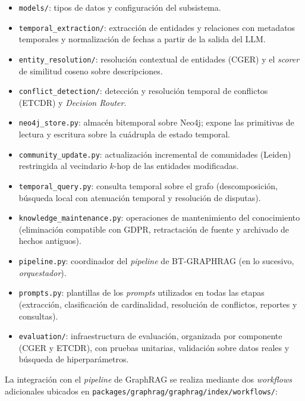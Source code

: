 \begin{itemize}
  \item \texttt{models/}: tipos de datos y configuración del subsistema.
  \item \texttt{temporal\_extraction/}: extracción de entidades y relaciones con metadatos temporales y normalización de fechas a partir de la salida del LLM.
  \item \texttt{entity\_resolution/}: resolución contextual de entidades (CGER) y el \emph{scorer} de similitud coseno sobre descripciones.
  \item \texttt{conflict\_detection/}: detección y resolución temporal de conflictos (ETCDR) y \emph{Decision Router}.
  \item \texttt{neo4j\_store.py}: almacén bitemporal sobre Neo4j; expone las primitivas de lectura y escritura sobre la cuádrupla de estado temporal.
  \item \texttt{community\_update.py}: actualización incremental de comunidades (Leiden) restringida al vecindario $k$-hop de las entidades modificadas.
  \item \texttt{temporal\_query.py}: consulta temporal sobre el grafo (descomposición, búsqueda local con atenuación temporal y resolución de disputas).
  \item \texttt{knowledge\_maintenance.py}: operaciones de mantenimiento del conocimiento (eliminación compatible con GDPR, retractación de fuente y archivado de hechos antiguos).
  \item \texttt{pipeline.py}: coordinador del \emph{pipeline} de BT-GRAPHRAG (en lo sucesivo, \emph{orquestador}).
  \item \texttt{prompts.py}: plantillas de los \emph{prompts} utilizados en todas las etapas (extracción, clasificación de cardinalidad, resolución de conflictos, reportes y consultas).
  \item \texttt{evaluation/}: infraestructura de evaluación, organizada por componente (CGER y ETCDR), con pruebas unitarias, validación sobre datos reales y búsqueda de hiperparámetros.
\end{itemize}

La integración con el \emph{pipeline} de GraphRAG se realiza mediante dos \emph{workflows} adicionales ubicados en \texttt{packages/graphrag/graphrag/index/workflows/}:

